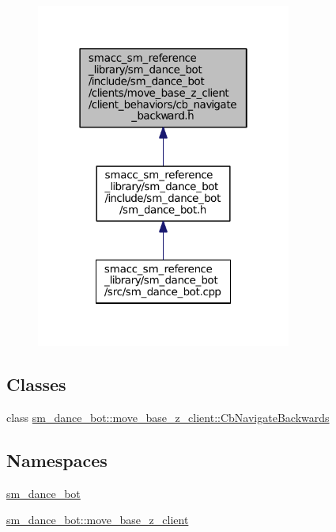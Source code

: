 \begin{figure}[H]
\begin{center}
\leavevmode
\includegraphics[width=238pt]{smacc__sm__reference__library_2sm__dance__bot_2include_2sm__dance__bot_2clients_2move__base__z__ae1f148aa41381322adf5c80162d3090}
\end{center}
\end{figure}
\subsection*{Classes}
\begin{DoxyCompactItemize}
\item 
class \hyperlink{classsm__dance__bot_1_1move__base__z__client_1_1CbNavigateBackwards}{sm\+\_\+dance\+\_\+bot\+::move\+\_\+base\+\_\+z\+\_\+client\+::\+Cb\+Navigate\+Backwards}
\end{DoxyCompactItemize}
\subsection*{Namespaces}
\begin{DoxyCompactItemize}
\item 
 \hyperlink{namespacesm__dance__bot}{sm\+\_\+dance\+\_\+bot}
\item 
 \hyperlink{namespacesm__dance__bot_1_1move__base__z__client}{sm\+\_\+dance\+\_\+bot\+::move\+\_\+base\+\_\+z\+\_\+client}
\end{DoxyCompactItemize}
